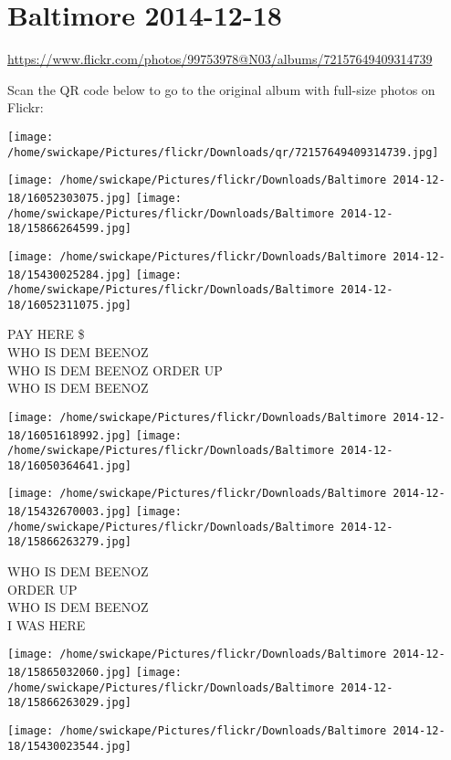 \documentclass[10pt,letterpaper]{article}
\title{}
\author{}
\date{}
\begin{document}
\section*{Baltimore 2014-12-18}

\url{https://www.flickr.com/photos/99753978@N03/albums/72157649409314739}

Scan the QR code below to go to the original album with full-size photos on Flickr:

\texttt{[image: /home/swickape/Pictures/flickr/Downloads/qr/72157649409314739.jpg]}
\pagebreak

\texttt{[image: /home/swickape/Pictures/flickr/Downloads/Baltimore 2014-12-18/16052303075.jpg]}
\texttt{[image: /home/swickape/Pictures/flickr/Downloads/Baltimore 2014-12-18/15866264599.jpg]}

\texttt{[image: /home/swickape/Pictures/flickr/Downloads/Baltimore 2014-12-18/15430025284.jpg]}
\texttt{[image: /home/swickape/Pictures/flickr/Downloads/Baltimore 2014-12-18/16052311075.jpg]}

PAY HERE \$\\
WHO IS DEM BEENOZ\\
WHO IS DEM BEENOZ ORDER UP\\
WHO IS DEM BEENOZ
\pagebreak

\texttt{[image: /home/swickape/Pictures/flickr/Downloads/Baltimore 2014-12-18/16051618992.jpg]}
\texttt{[image: /home/swickape/Pictures/flickr/Downloads/Baltimore 2014-12-18/16050364641.jpg]}

\texttt{[image: /home/swickape/Pictures/flickr/Downloads/Baltimore 2014-12-18/15432670003.jpg]}
\texttt{[image: /home/swickape/Pictures/flickr/Downloads/Baltimore 2014-12-18/15866263279.jpg]}

WHO IS DEM BEENOZ\\
ORDER UP\\
WHO IS DEM BEENOZ\\
I WAS HERE
\pagebreak

\texttt{[image: /home/swickape/Pictures/flickr/Downloads/Baltimore 2014-12-18/15865032060.jpg]}
\texttt{[image: /home/swickape/Pictures/flickr/Downloads/Baltimore 2014-12-18/15866263029.jpg]}

\vspace{0.25in}
\texttt{[image: /home/swickape/Pictures/flickr/Downloads/Baltimore 2014-12-18/15430023544.jpg]}
\end{document}
